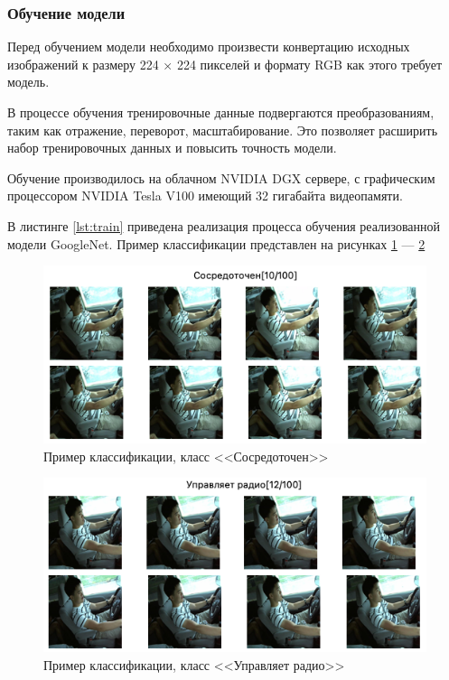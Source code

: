 \subsubsection{Обучение модели}
Перед обучением модели необходимо произвести конвертацию исходных изображений к размеру 224 × 224 пикселей и формату RGB как этого требует модель.

В процессе обучения тренировочные данные подвергаются преобразованиям, таким как отражение, переворот, масштабирование. Это позволяет расширить набор тренировочных данных и повысить точность модели.

Обучение производилось на облачном NVIDIA DGX \cite{dgx} сервере, с графическим процессором NVIDIA Tesla V100 имеющий 32 гигабайта видеопамяти.

В листинге \ref{lst:train} приведена реализация процесса обучения реализованной модели GoogleNet.
Пример классификации представлен на рисунках \ref{fig:train_example_1} --- \ref{fig:train_example_2}

\begin{figure}[hbtp]
	\centering
	\includegraphics[scale=0.8]{img/train_example.png}
	\caption{Пример классификации, класс <<Сосредоточен>>}
	\label{fig:train_example_1}
\end{figure}

\begin{figure}[hbtp]
	\centering
	\includegraphics[scale=0.8]{img/train_example_2.png}
	\caption{Пример классификации, класс <<Управляет радио>>}
	\label{fig:train_example_2}
\end{figure}

